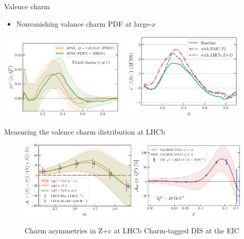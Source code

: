 \documentclass[aspectratio=43, 8pt,t]{beamer}
\begin{document}
\begin{frame}{Valence charm}
  \begin{itemize}
    \item Nonvanishing valance charm PDF at large-$x$
  \end{itemize}

  \vspace*{1em}
  \includegraphics[width=0.45\textwidth]{valence_3fns_vs_4fns.png}
  \includegraphics[width=0.45\textwidth]{valence_evidence.png}
\end{frame}


\begin{frame}{Measuring the valence charm distribution at LHCb}
  \begin{figure}
    \includegraphics[width=0.49\textwidth]{lhcb-zcharm-pheno-asymm.pdf}
    \includegraphics[width=0.49\textwidth]{ICasym-main-Fig4-EIC.pdf}
    \caption*{Charm asymmetries in Z+c at LHCb \hspace*{7em} Charm-tagged DIS at the EIC}
  \end{figure}
\end{frame}
\end{document}
